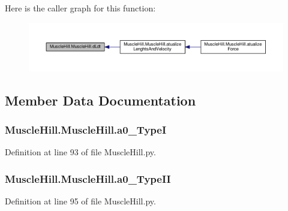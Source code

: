Here is the caller graph for this function\+:
\nopagebreak
\begin{figure}[H]
\begin{center}
\leavevmode
\includegraphics[width=350pt]{class_muscle_hill_1_1_muscle_hill_afbcb208bf18110d5fe1d498db8b6f95c_icgraph}
\end{center}
\end{figure}




\subsection{Member Data Documentation}
\subsubsection[{\texorpdfstring{a0\+\_\+\+TypeI}{a0_TypeI}}]{\setlength{\rightskip}{0pt plus 5cm}Muscle\+Hill.\+Muscle\+Hill.\+a0\+\_\+\+TypeI}\hypertarget{class_muscle_hill_1_1_muscle_hill_ae0bd0dd6f69feabc6559f99de4dfc872}{}\label{class_muscle_hill_1_1_muscle_hill_ae0bd0dd6f69feabc6559f99de4dfc872}


Definition at line 93 of file Muscle\+Hill.\+py.

\subsubsection[{\texorpdfstring{a0\+\_\+\+Type\+II}{a0_TypeII}}]{\setlength{\rightskip}{0pt plus 5cm}Muscle\+Hill.\+Muscle\+Hill.\+a0\+\_\+\+Type\+II}\hypertarget{class_muscle_hill_1_1_muscle_hill_a72509cfa26f990d482ba77ef8eba423a}{}\label{class_muscle_hill_1_1_muscle_hill_a72509cfa26f990d482ba77ef8eba423a}


Definition at line 95 of file Muscle\+Hill.\+py.

